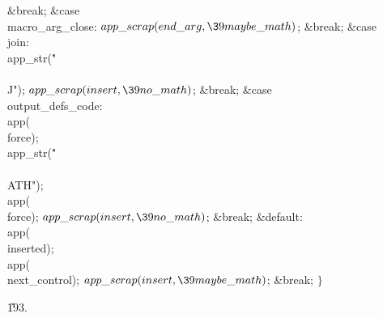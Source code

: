 \&{break};\6
\4\&{case} \\{macro\_arg\_close}:\5
${}\\{app\_scrap}(\\{end\_arg},\39\\{maybe\_math}){}$;\5
\&{break};\6
\4\&{case} \\{join}:\5
\\{app\_str}(\.{"\\\\J"});\5
${}\\{app\_scrap}(\\{insert},\39\\{no\_math}){}$;\5
\&{break};\6
\4\&{case} \\{output\_defs\_code}:\5
\\{app}(\\{force});\5
\\{app\_str}(\.{"\\\\ATH"});\5
\\{app}(\\{force});\6
${}\\{app\_scrap}(\\{insert},\39\\{no\_math}){}$;\5
\&{break};\6
\4\&{default}:\5
\\{app}(\\{inserted});\5
\\{app}(\\{next\_control});\6
${}\\{app\_scrap}(\\{insert},\39\\{maybe\_math}){}$;\5
\&{break};\6
\4${}\}{}$\2\par
\U193.\fi

